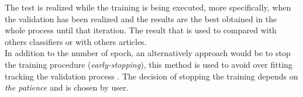 The test is realized while the training is being executed, more specifically, when the validation has been realized and the results are the best obtained in the whole process until that iteration. The result that is used to compared with others classifiers or with others articles.\\

In addition to the number of epoch, an alternatively approach would be to stop the training procedure (\textit{early-stopping}), this method is used to avoid over fitting tracking the validation process \cite{Yoshua}. The decision of stopping the training depends on \textit{the patience} and is chosen by user.\\






